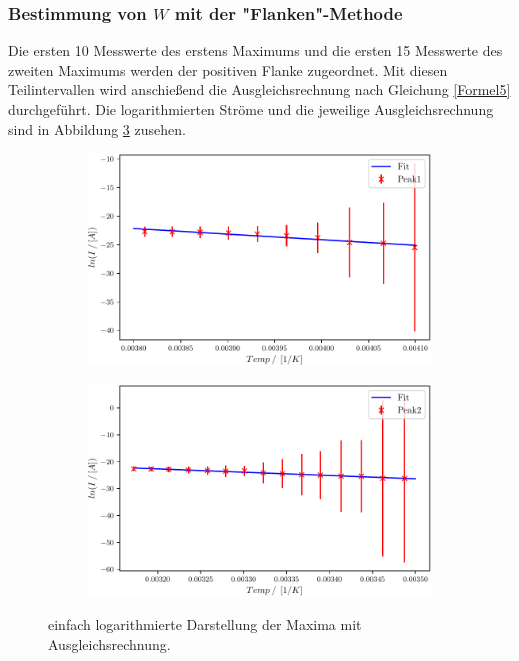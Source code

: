 \subsubsection{Bestimmung von $W$ mit der "Flanken"-Methode}

Die ersten 10 Messwerte des erstens Maximums und die ersten 15 Messwerte des zweiten Maximums werden der positiven Flanke zugeordnet. Mit diesen Teilintervallen wird anschießend die Ausgleichsrechnung nach Gleichung \eqref{Formel5} durchgeführt. Die logarithmierten Ströme und die jeweilige Ausgleichsrechnung sind in Abbildung \ref{fig:Auswertung_7_8} zusehen.


\begin{figure}
\centering
\begin{subfigure}{.5\textwidth}
	\centering
	\includegraphics[width=1\textwidth]{build/1_Temp_current_peak_log_fit.pdf}
	\caption{}
	\label{fig:Auswertung_7}
\end{subfigure}%
\begin{subfigure}{.5\textwidth}
	\centering
	\includegraphics[width=1\textwidth]{build/1_Temp_current_peak2_log_fit.pdf}
	\caption{}
	\label{fig:Auswertung_8}
\end{subfigure}
\caption{einfach logarithmierte Darstellung der Maxima mit Ausgleichsrechnung.}
\label{fig:Auswertung_7_8}
\end{figure}

